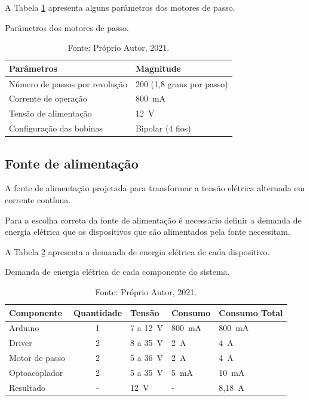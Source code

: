 A Tabela \ref{tab:pmotordepasso} apresenta alguns parâmetros dos motores de passo.

\begin{table}[H]
    \footnotesize
    \centering
    \caption{Parâmetros dos motores de passo.}
    \begin{tabular}{ll}
        \hline
        \textbf{Parâmetros} & \textbf{Magnitude}\\
        \hline
        Número de passos por revolução & 200 (1,8 graus por passo)\\
        Corrente de operação & 800~mA\\
        Tensão de alimentação & 12~V\\
        Configuração das bobinas & Bipolar (4 fios)\\
        \hline       
    \end{tabular}
    \caption*{Fonte: Próprio Autor, 2021.}
    \label{tab:pmotordepasso}
\end{table}

\subsection{Fonte de alimentação}\label{subsec:metfonte}

A fonte de alimentação projetada para transformar a tensão elétrica alternada em corrente contínua.

Para a escolha correta da fonte de alimentação é necessário definir a demanda de energia elétrica 
que os dispositivos que são alimentados pela fonte necessitam.

A Tabela \ref{tab:demandafonte} apresenta a demanda de energia elétrica de cada dispositivo.

\begin{table}[H]
    \footnotesize
    \centering
    \caption{Demanda de energia elétrica de cada componente do sistema.}
    \begin{tabular}{lclll}
        \hline
        \textbf{Componente} & \textbf{Quantidade} & \textbf{Tensão} & \textbf{Consumo} & \textbf{Consumo Total}\\
        \hline
        Arduino & 1 & 7 a 12~V & 800~mA & 800~mA\\
        Driver & 2 & 8 a 35~V & 2~A & 4~A\\
        Motor de passo & 2 & 5 a 36~V & 2~A & 4~A\\
        Optoacoplador & 2 & 5 a 35~V & 5~mA & 10~mA\\
        Resultado & - & 12~V & - & 8,18~A\\
        \hline       
    \end{tabular}
    \caption*{Fonte: Próprio Autor, 2021.}
    \label{tab:demandafonte}
\end{table}

